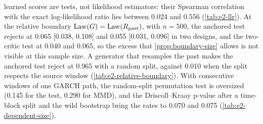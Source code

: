learned scores are tests, not likelihood estimators: their Spearman correlation with the exact
log-likelihood ratio lies between 0.024 and 0.556 (\cref{tab:e2-llr}). At the relative boundary
$\operatorname{Law}(G)=\operatorname{Law}(R_{\mathrm{past}})$, with $n=500$, the anchored test rejects at 0.065 [0.038, 0.108] and 0.055
[0.031, 0.096] in two designs, and the two-critic test at 0.040 and 0.065, so the excess that
\cref{prop:boundary-size} allows is not visible at this sample size. A generator that resamples
the past makes the anchored test reject at 0.965 with a random split, against 0.010 when the split
respects the source window (\cref{tab:e2-relative-boundary}). With consecutive windows of one GARCH
path, the random-split permutation test is oversized (0.145 for the \WC{} test, 0.290 for MMD),
and the Driscoll--Kraay p-value after a time-block split and the wild bootstrap bring the rates to
0.070 and 0.075 (\cref{tab:e2-dependent-size}).

